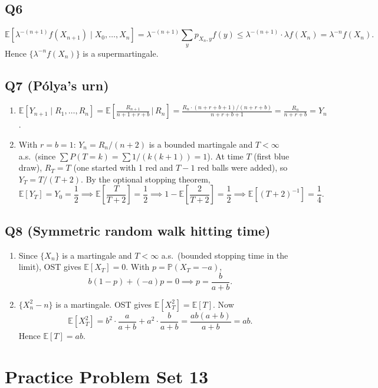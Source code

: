 \documentclass[11pt]{article}
\newcommand{\PP}{\mathbb{P}}
\newcommand{\EE}{\mathbb{E}}
\newcommand{\1}{\mathbf{1}}
\begin{document}
\subsection*{Q6}
\[
\EE[\lambda^{-(n+1)}f(X_{n+1})\mid X_0,\ldots,X_n]
=\lambda^{-(n+1)}\sum_y p_{X_n,y}f(y)
\le\lambda^{-(n+1)}\cdot\lambda f(X_n)=\lambda^{-n}f(X_n).
\]
Hence $\{\lambda^{-n}f(X_n)\}$ is a supermartingale.

\subsection*{Q7 (P\'olya's urn)}
\begin{enumerate}[label=(\alph*)]
\item $\EE[Y_{n+1}\mid R_1,\ldots,R_n]=\EE\!\left[\frac{R_{n+1}}{n+1+r+b}\,\bigg|\,R_n\right]
=\frac{R_n\cdot(n+r+b+1)/(n+r+b)}{n+r+b+1}=\frac{R_n}{n+r+b}=Y_n$.
\item With $r=b=1$: $Y_n=R_n/(n+2)$ is a bounded martingale and $T<\infty$ a.s.\ (since $\sum P(T=k)=\sum 1/(k(k+1))=1$).  At time $T$ (first blue draw), $R_T=T$ (one started with 1 red and $T-1$ red balls were added), so $Y_T=T/(T+2)$.  By the optional stopping theorem,
\[
\EE[Y_T]=Y_0=\frac{1}{2}\implies\EE\!\left[\frac{T}{T+2}\right]=\frac{1}{2}\implies1-\EE\!\left[\frac{2}{T+2}\right]=\frac{1}{2}\implies\EE\!\left[(T+2)^{-1}\right]=\frac{1}{4}.
\]
\end{enumerate}

\subsection*{Q8 (Symmetric random walk hitting time)}
\begin{enumerate}[label=(\alph*)]
\item Since $\{X_n\}$ is a martingale and $T<\infty$ a.s.\ (bounded stopping time in the limit), OST gives $\EE[X_T]=0$.  With $p=\PP(X_T=-a)$,
\[
b(1-p)+(-a)p=0\implies p=\frac{b}{a+b}.
\]
\item $\{X_n^2-n\}$ is a martingale.  OST gives $\EE[X_T^2]=\EE[T]$.  Now
\[
\EE[X_T^2]=b^2\cdot\frac{a}{a+b}+a^2\cdot\frac{b}{a+b}=\frac{ab(a+b)}{a+b}=ab.
\]
Hence $\EE[T]=ab$.
\end{enumerate}

\section{Practice Problem Set 13}
\end{document}
